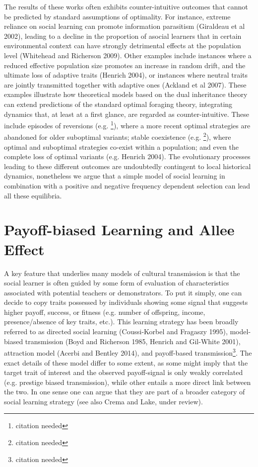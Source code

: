 \documentclass[preprint,authoryear]{elsarticle}
\begin{document}
The results of these works often exhibits counter-intuitive outcomes that cannot be predicted by standard assumptions of optimality. For instance, extreme reliance on social learning can promote information parasitism (Giraldeau et al 2002), leading to a decline in the proportion of asocial learners that in certain environmental context can have strongly detrimental effects at the population level (Whitehead and Richerson 2009). Other examples include instances where a reduced effective population size promotes an increase in random drift, and the ultimate loss of adaptive traits (Henrich 2004), or instances where neutral traits are jointly transmitted together with adaptive ones (Ackland et al 2007). These examples illustrate how theoretical models based on the dual inheritance theory can extend predictions of the standard optimal foraging theory, integrating dynamics that, at least at a first glance,  are regarded as counter-intuitive. These include episodes of reversions (e.g. \footnote{citation needed}), where a more recent optimal strategies are abandoned for older suboptimal variants; stable coexistence (e.g. \footnote{citation needed}), where optimal and suboptimal strategies co-exist within a population; and even the complete loss of optimal variants (e.g. Henrich 2004). The evolutionary processes leading to these different outcomes are undoubtedly contingent to local historical dynamics, nonetheless we argue that a simple model of social learning in combination with a positive and negative frequency dependent selection can lead all these equilibria.

\section{Payoff-biased Learning and Allee Effect}

A key feature that underlies many models of cultural transmission is that the social learner is often guided by some form of evaluation of characteristics associated with potential teachers or demonstrators. To put it simply, one can decide to copy traits possessed by individuals showing some signal that suggests higher payoff, success, or fitness (e.g. number of offspring, income, presence/absence of key traits, etc.). This learning strategy has been broadly referred to as directed social learning (Coussi-Korbel and Fragaszy 1995), model-biased transmission (Boyd and Richerson 1985, Henrich and Gil-White 2001), attraction model (Acerbi and Bentley 2014), and payoff-based transmission\footnote{citation needed}. The exact details of these model differ to some extent, as some might imply that the target trait of interest and the observed payoff-signal is only weakly correlated (e.g. prestige biased transmission), while other entails a more direct link between the two. In one sense one can argue that they are part of a broader category of social learning strategy (see also Crema and Lake, under review).  
\end{document}
